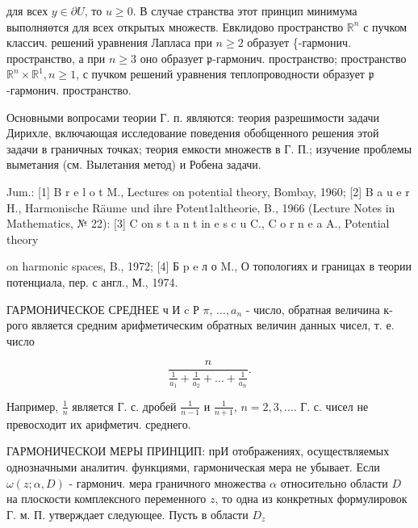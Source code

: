 \documentclass[10pt]{article}
\begin{document}
для всех $y \in \partial U$, то $u \geqslant 0$. В случае странства этот принцип минимума выполняөтся для всех открытых множеств. Евклидово пространство $\mathbb{R}^{n}$ с пучком классич. решений уравнения Лапласа при $n \geqslant 2$ образует \{-гармонич. пространство, а при $n \geqslant 3$ оно образует $\mathfrak{p}$-гармонич. пространство; пространство $\mathbb{R}^{n} \times \mathbb{R}^{1}, n \geqslant 1$, с пучком решений уравнения теплопроводности образует $\mathfrak{p}$-гармонич. пространство.



Основными вопросами теории Г. п. являются: теория разрешимости задачи Дирихле, включающая исследование поведения обобщенного решения этой задачи в граничных точках; теория емкости множеств в Г. П.; изучение проблемы выметания (см. Bылетания метод) и Робена задачи.



Jum.: [1] B r e l o t M., Lectures on potential theory, Bombay, 1960; [2] B a u e r H., Harmonische Räume und ihre Potent1altheorie, B., 1966 (Lecture Notes in Mathematics, № 22): [3] C on s t a n t in e s c u C., C o r n e a A., Potential theory

on harmonic spaces, B., 1972; [4] Б p e л о M., О топологиях и границах в теории потенциала, пер. с англ., М., 1974.



ГАРМОНИЧЕСКОЕ СРЕДНЕЕ ч И $\mathrm{c}$ Р $\pi$, $\ldots, a_{n}$ - число, обратная величина к-рого является средним арифметическим обратных величин данных чисел, т. е. число



\[

\frac{n}{\frac{1}{a_{1}}+\frac{1}{a_{2}}+\ldots+\frac{1}{a_{n}}} .

\]



Например, $\frac{1}{n}$ является Г. с. дробей $\frac{1}{n-1}$ и $\frac{1}{n+1}$, $n=2,3, \ldots$. Г. с. чисел не превосходит их арифметич. среднего.



ГАРМОНИЧЕСКОИ МЕРЫ ПРИНЦИП: прИ отображениях, осуществляемых однозначными аналитич. функциями, гармоническая мера не убывает. Если $\omega(z ; \alpha, D)$ - гармонич. мера граничного множества $\alpha$ относительно области $D$ на плоскости комплексного переменного $z$, то одна из конкретных формулировок Г. м. П. утверждает следующее. Пусть в области $D_{z}$
\end{document}
